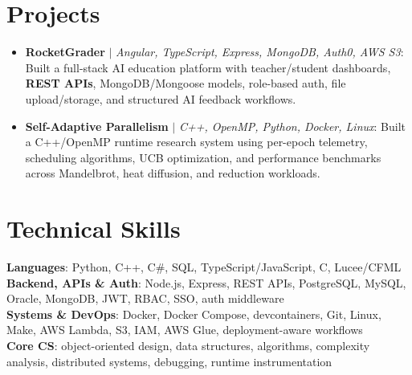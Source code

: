 \documentclass[letterpaper,11pt]{article}
\begin{document}
\section{Projects}
\begin{itemize}[leftmargin=0.15in, label={}, itemsep=-1pt, topsep=0pt, parsep=0pt]
  \item\small{\textbf{RocketGrader} $|$ \emph{Angular, TypeScript, Express, MongoDB, Auth0, AWS S3}: Built a full-stack AI education platform with teacher/student dashboards, \textbf{REST APIs}, MongoDB/Mongoose models, role-based auth, file upload/storage, and structured AI feedback workflows.}
  \item\small{\textbf{Self-Adaptive Parallelism} $|$ \emph{C++, OpenMP, Python, Docker, Linux}: Built a C++/OpenMP runtime research system using per-epoch telemetry, scheduling algorithms, UCB optimization, and performance benchmarks across Mandelbrot, heat diffusion, and reduction workloads.}
\end{itemize}\vspace{-7pt}

\section{Technical Skills}
 \begin{itemize}[leftmargin=0.15in, label={}]
    \small{\item{
     \textbf{Languages}{: Python, C++, C\#, SQL, TypeScript/JavaScript, C, Lucee/CFML} \\
     \textbf{Backend, APIs \& Auth}{: Node.js, Express, REST APIs, PostgreSQL, MySQL, Oracle, MongoDB, JWT, RBAC, SSO, auth middleware} \\
     \textbf{Systems \& DevOps}{: Docker, Docker Compose, devcontainers, Git, Linux, Make, AWS Lambda, S3, IAM, AWS Glue, deployment-aware workflows} \\
     \textbf{Core CS}{: object-oriented design, data structures, algorithms, complexity analysis, distributed systems, debugging, runtime instrumentation}
    }}
 \end{itemize}
\end{document}
